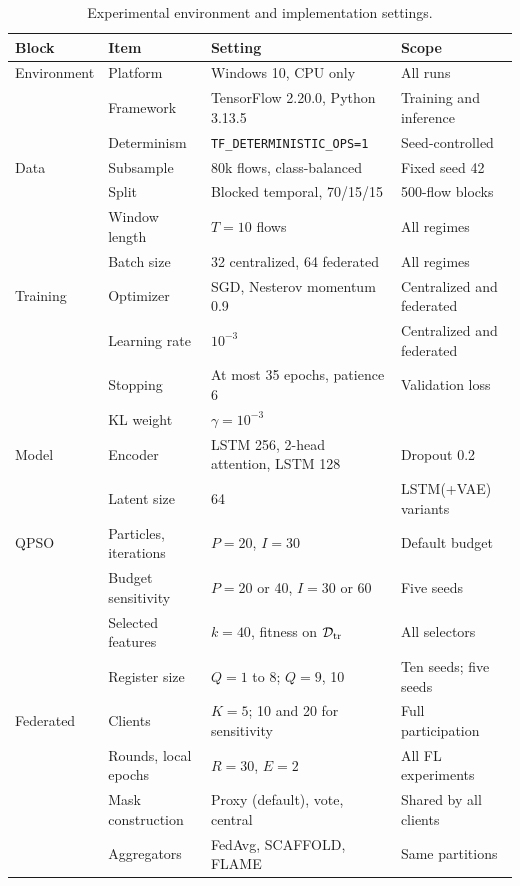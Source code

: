 \documentclass[conference]{IEEEtran}
\begin{document}
\begin{table}[!htbp]
\centering
\caption{Experimental environment and implementation settings.}
\label{tab:impl_setup}
\setlength{\tabcolsep}{8pt}
\renewcommand{\arraystretch}{1.3}
\begin{tabular}{l l l l}
\hline\toprule
\textbf{Block} & \textbf{Item} & \textbf{Setting} & \textbf{Scope} \\
\hline\toprule
Environment & Platform & Windows 10, CPU only & All runs \\
 & Framework & TensorFlow 2.20.0, Python 3.13.5 & Training and inference \\
 & Determinism & \texttt{TF\_DETERMINISTIC\_OPS=1} & Seed-controlled \\
\midrule
Data & Subsample & 80k flows, class-balanced & Fixed seed 42 \\
 & Split & Blocked temporal, 70/15/15 & 500-flow blocks \\
 & Window length & $T=10$ flows & All regimes \\
 & Batch size & 32 centralized, 64 federated & All regimes \\
\midrule
Training & Optimizer & SGD, Nesterov momentum 0.9 & Centralized and federated \\
 & Learning rate & $10^{-3}$ & Centralized and federated \\
 & Stopping & At most 35 epochs, patience 6 & Validation loss \\
 & KL weight & $\gamma=10^{-3}$ & \\
\midrule
Model & Encoder & LSTM 256, 2-head attention, LSTM 128 & Dropout 0.2 \\
 & Latent size & 64 & LSTM(+VAE) variants \\
\midrule
QPSO & Particles, iterations & $P=20$, $I=30$ & Default budget \\
 & Budget sensitivity & $P=20$ or 40, $I=30$ or 60 & Five seeds \\
 & Selected features & $k=40$, fitness on $\mathcal{D}_{\rm tr}$ & All selectors \\
 & Register size & $Q=1$ to 8; $Q=9$, 10 & Ten seeds; five seeds \\
\midrule
Federated & Clients & $K=5$; 10 and 20 for sensitivity & Full participation \\
 & Rounds, local epochs & $R=30$, $E=2$ & All FL experiments \\
 & Mask construction & Proxy (default), vote, central & Shared by all clients \\
 & Aggregators & FedAvg, SCAFFOLD, FLAME & Same partitions \\
\hline\toprule
\end{tabular}
\end{table}
\end{document}
